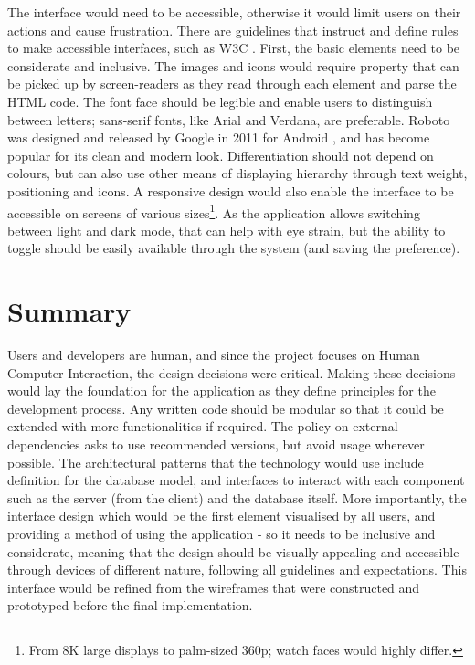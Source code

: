\documentclass[../main.tex]{subfiles}
\begin{document}
The interface would need to be accessible, otherwise it would limit users on their actions and cause frustration. There are guidelines that instruct and define rules to make accessible interfaces, such as W3C \cite{AccessibilityW3C}. First, the basic elements need to be considerate and inclusive. The images and icons would require  property that can be picked up by screen-readers as they read through each element and parse the HTML code. The font face should be legible and enable users to distinguish between letters; sans-serif fonts, like Arial and Verdana, are preferable. Roboto was designed and released by Google in 2011 for Android \cite{GoogleUnwrapsIce}, and has become popular for its clean and modern look. Differentiation should not depend on colours, but can also use other means of displaying hierarchy through text weight, positioning and icons. A responsive design would also enable the interface to be accessible on screens of various sizes\footnote{From 8K large displays to palm-sized 360p; watch faces would highly differ.}. As the application allows switching between light and dark mode, that can help with eye strain, but the ability to toggle should be easily available through the system (and saving the preference).

\section*{Summary}

Users and developers are human, and since the project focuses on Human Computer Interaction, the design decisions were critical. Making these decisions would lay the foundation for the application as they define principles for the development process. Any written code should be modular so that it could be extended with more functionalities if required. The policy on external dependencies asks to use recommended versions, but avoid usage wherever possible. The architectural patterns that the technology would use include definition for the database model, and interfaces to interact with each component such as the server (from the client) and the database itself. More importantly, the interface design which would be the first element visualised by all users, and providing a method of using the application - so it needs to be inclusive and considerate, meaning that the design should be visually appealing and accessible through devices of different nature, following all guidelines and expectations. This interface would be refined from the wireframes that were constructed and prototyped before the final implementation.
\end{document}
